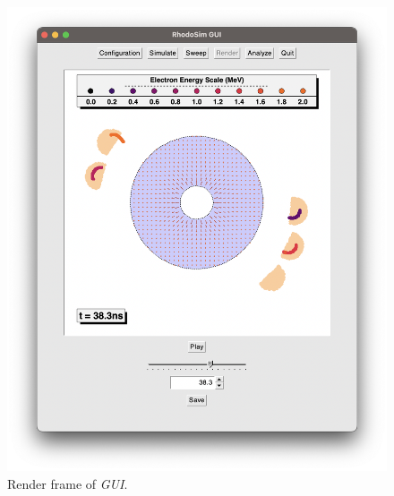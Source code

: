 \documentclass[a4paper,oneside,12pt]{report}
\numberwithin{equation}{chapter}
\begin{document}
\begin{figure}
    \centering
    \includegraphics[width=\linewidth]{./figures/rhodoSim/GUI_render_frame_6.png}
    \caption{Render frame of \textit{GUI}.}
    \label{fig:gui_render_2}
\end{figure}
\end{document}
